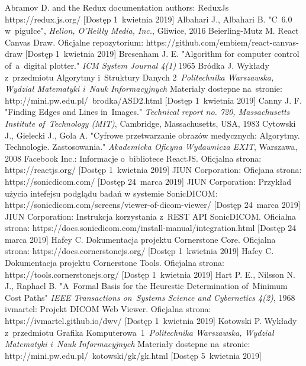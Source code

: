 \documentclass[a4paper,11pt,twoside,openright]{report}
\theoremstyle{definition}
\begin{document}
\begin{thebibliography}{24}
 Abramov D. and the Redux documentation authors: ReduxJs https://redux.js.org/ [Dostęp 1~kwietnia 2019]
 Albahari J., Albahari B. "C~6.0 w~pigułce", \emph{Helion, O'Reilly Media, Inc.}, Gliwice,  2016
 Beierling-Mutz M. React Canvas Draw. Oficjalne repozytorium: https://github.com/embiem/react-canvas-draw [Dostęp 1~kwietnia 2019]
 Bresenham J. E. "Algorithm for computer control of~a~digital plotter." \emph{ICM System Journal 4(1)} 1965
 Bródka J. Wykłady z~przedmiotu Algorytmy i~Struktury Danych 2~\emph{Politechnika Warszawska, Wydział Matematyki i~Nauk Informacyjnych} Materiały dostepne na~stronie: http://mini.pw.edu.pl/~brodka/ASD2.html [Dostęp 1~kwietnia 2019]
 Canny J. F. "Finding Edges and Lines in~Images." \emph{Technical report no. 720, Massachusetts Institute of~Technology (MIT)}, Cambridge, Massachusetts, USA, 1983
 Cytowski J., Gielecki J., Gola A. "Cyfrowe przetwarzanie obrazów medycznych: Algorytmy. Technologie. Zastosowania." \emph{Akademicka Oficyna Wydawnicza EXIT}, Warszawa, 2008
 Facebook Inc.: Informacje o~bibliotece ReactJS. Oficjalna strona: https://reactjs.org/ [Dostęp 1~kwietnia 2019]
 JIUN Corporation: Oficjana strona: https://sonicdicom.com/ [Dostęp 24~marca 2019]
 JIUN Corporation: Przykład użycia intefejsu podglądu badań w systemie SonicDICOM: https://sonicdicom.com/screens/viewer-of-dicom-viewer/ [Dostęp 24~marca 2019]
 JIUN Corporation: Instrukcja korzystania z~REST API SonicDICOM. Oficialna strona: https://docs.sonicdicom.com/install-manual/integration.html [Dostęp 24 marca 2019]
 Hafey C. Dokumentacja projektu Cornerstone Core. Oficjalna strona: https://docs.cornerstonejs.org/ [Dostęp 1~kwietnia 2019]
 Hafey C. Dokumentacja projektu Cornerstone Tools. Oficjalna strona: https://tools.cornerstonejs.org/ [Dostęp 1~kwietnia 2019]
 Hart P. E., Nilsson N. J., Raphael B. "A~Formal Basis for the Heurestic Determination of~Minimum Cost Paths" \emph{IEEE Transactions on~Systems Science and Cybernetics 4(2)}, 1968
 ivmartel: Projekt DICOM Web Viewer. Oficjalna strona: https://ivmartel.github.io/dwv/ [Dostęp 1~kwietnia 2019]
 Kotowski P. Wykłady z~przedmiotu Grafika Komputerowa~1~\emph{Politechnika Warszawska, Wydział Matematyki i~Nauk Informacyjnych} Materiały dostepne na~stronie: http://mini.pw.edu.pl/~kotowski/gk/gk.html [Dostęp 5~kwietnia 2019]

\end{thebibliography}
\end{document}
